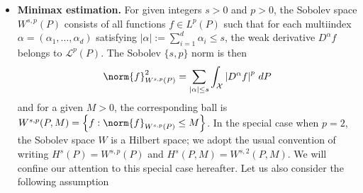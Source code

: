 \documentclass{article}
\newcommand{\abs}[1]{\left \lvert #1 \right \rvert}
\newcommand{\set}[1]{\left\{#1\right\}}
\newcommand{\1}{\mathbf{1}}
\newcommand{\Leb}{L}
\theoremstyle{alden}
\theoremstyle{aldenthm}
\theoremstyle{definition}
\theoremstyle{remark}
\begin{document}
\begin{itemize}
	\item \textbf{Minimax estimation.} For given integers $s > 0$ and $p > 0$, the Sobolev space $W^{s,p}(P)$ consists of all functions $f \in \Leb^p(P)$ such that for each multiindex $\alpha = (\alpha_1,\ldots,\alpha_d)$ satisfying $\abs{\alpha} := \sum_{i = 1}^{d} \alpha_i \leq s$, the weak derivative $D^{\alpha}f$ belongs to $\mathcal{L}^p(P)$. The Sobolev $\{s,p\}$ norm is then 
	\begin{equation*}
	\norm{f}_{W^{s,p}(P)}^2 = \sum_{\abs{\alpha} \leq s} \int_{\mathcal{X}} \abs{D^{\alpha}f}^p \,dP
	\end{equation*}
	and for a given $M > 0$, the corresponding ball is $W^{s,p}(P, M) = \set{f: \norm{f}_{W^{s,p}(P)} \leq M}$. In the special case when $p = 2$, the Sobolev space $W$ is a Hilbert space; we adopt the usual convention of writing $H^s(P) = W^{s,p}(P)$ and $H^s(P,M) = W^{s,2}(P,M)$. We will confine our attention to this special case hereafter. Let us also consider the following assumption
	

\end{itemize}
\end{document}
